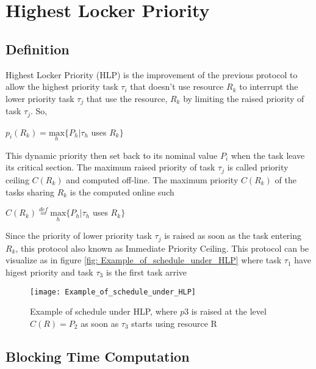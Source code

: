 \section{Highest Locker Priority}

\subsection{Definition}

Highest Locker Priority (HLP) is the improvement of the previous protocol to allow the highest priority task $\tau_{i}$ that doesn't use resource $R_{k}$ to interrupt the lower priority task $\tau_{j}$ that use the resource, $R_{k}$ by limiting the raised priority of task $\tau_{j}$. So,
 
\begin{center}
 $p_{i}(R_{k})=\underset{h}{\mathrm{max}} \{P_{h}| \tau_{h}$ uses $R_{k}\}  $ \cite{b5}
\end{center}

This dynamic priority then set back to its nominal value $P_{i}$ when the task leave its critical section. The maximum raised priority of task $\tau_{j}$ is called priority ceiling $ C(R_{k}) $ and computed off-line.  The maximum priority $ C(R_{k}) $ of the tasks sharing $ R_{k} $ is the computed online such

\begin{center}
$C(R_{k})\stackrel{def}{=}\underset{h}{\mathrm{max}} \{P_{h}| \tau_{h}$ uses $R_{k}\}  $ \cite{b5}
\end{center}

Since the priority of lower priority task $\tau_{j}$ is raised as soon as the task entering $ R_{k} $, this protocol also known as Immediate Priority Ceiling. This protocol can be visualize as in figure \ref{fig: Example_of_schedule_under_HLP} where task $ \tau_{1} $ have higest priority and task $ \tau_{3} $ is the first task arrive

\begin{figure}[h]
    \centering
    \texttt{[image: Example\_of\_schedule\_under\_HLP]}
    \caption{ Example of schedule under HLP, where $ p3 $ is raised at the level $ C(R) = P_{2} $ as soon as $ \tau_{3} $ starts using resource R \cite{b5}}
    \label{fig:Example_of_schedule_under_HLP}
\end{figure}

 
\subsection{Blocking Time Computation}

